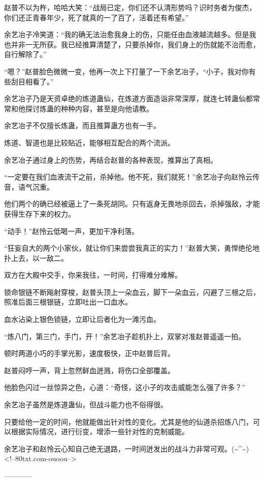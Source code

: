 \begin{this_body}
赵普不以为杵，哈哈大笑：“战局已定，你们还不认清形势吗？识时务者为俊杰，你们还正青春年少，死了就真的一了百了，活着还有希望。”

余艺冶子冷笑道：“我的确无法治愈我身上的伤，只能任由血液越流越多。但是我也并非一无所获。我已经推算清楚了，只要杀掉你，我们身上的伤就能不治而愈，自行解除了。”

“嗯？”赵普脸色微微一变，他再一次上下打量了一下余艺冶子，“小子，我对你有些刮目相看了。”

余艺冶子乃是天资卓绝的炼道蛊仙，在炼道方面造诣非常深厚，就连七转蛊仙都常常和他探讨炼蛊的种种内容，甚至是向他请教。

余艺冶子不仅擅长炼蛊，而且推算蛊方也有一手。

炼道、智道也是比较贴近，能够相互配合的两个流派。

余艺冶子通过身上的伤势，再结合赵普的各种表现，推算出了真相。

“一定要在我们血液流干之前，杀掉他。他不死，我们就死！”余艺冶子向赵怜云传音，语气沉重。

他们两个的确已经被逼上了一条死胡同。只有返身无畏地杀回去，杀掉强敌，才能获得生存下来的权力。

“动手！”赵怜云低喝一声，更加干净利落。

“狂妄自大的两个小家伙，就让你们来尝尝我真正的实力！”赵普大笑，勇悍绝伦地扑上去，以一敌二。

双方在大殿中交手，你来我往，一时间，打得难分难解。

锁命银链不断飚射穿梭，赵普头顶上一朵血云，脚下一朵血云，闪避了三根之后，照准后面三根银链，立即吐出一口血水。

血水沾染上银色锁链，立即让后者化为一滩污血。

“炼八门，第三门，手门，开！”余艺冶子趁机扑上，双掌对准赵普遥遥一拍。

顿时两道小巧的手掌光影，速度极快，正中赵普后背。

赵普闷哼一声，背上忽然鲜血迸溅，将伤口全部覆盖。

他脸色闪过一丝惊异之色，心道：“奇怪，这小子的攻击威能怎么强了许多？”

余艺冶子虽然是炼道蛊仙，但战斗能力也不俗得很。

只要给他一定的时间，他就能做出针对性的变化。尤其是他的仙道杀招炼八门，可以根据实际情况，进行衍变，增添一些针对性的克制威能。

余艺冶子和赵怜云心知自己绝无退路，一时间迸发出的战斗力非常可观。(\~{}\^{}\~{})<!--80txt.com-ouoou-->

------------

\end{this_body}

